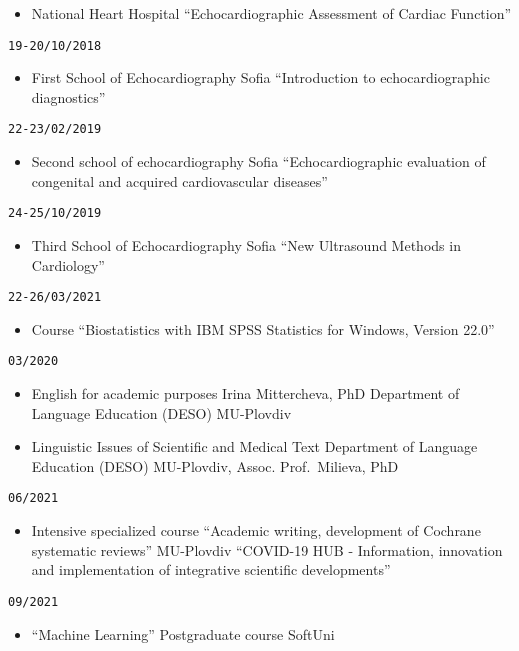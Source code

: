 \documentclass[
  12pt,
  letterpaper,
  DIV=11,
  numbers=noendperiod]{scrartcl}
\providecommand{\tightlist}{%
  \setlength{\itemsep}{0pt}\setlength{\parskip}{0pt}}\usepackage{longtable,booktabs,array}
\begin{document}
\begin{itemize}
\tightlist
\item
  National Heart Hospital \textbar{} ``Echocardiographic Assessment of
  Cardiac Function''
\end{itemize}

\texttt{19-20/10/2018}

\begin{itemize}
\tightlist
\item
  First School of Echocardiography \textbar{} Sofia \textbar{}
  ``Introduction to echocardiographic diagnostics''
\end{itemize}

\texttt{22-23/02/2019}

\begin{itemize}
\tightlist
\item
  Second school of echocardiography \textbar{} Sofia \textbar{}
  ``Echocardiographic evaluation of congenital and acquired
  cardiovascular diseases''
\end{itemize}

\texttt{24-25/10/2019}

\begin{itemize}
\tightlist
\item
  Third School of Echocardiography \textbar{} Sofia \textbar{} ``New
  Ultrasound Methods in Cardiology''
\end{itemize}

\texttt{22-26/03/2021}

\begin{itemize}
\tightlist
\item
  Course ``Biostatistics with IBM SPSS Statistics for Windows, Version
  22.0''
\end{itemize}

\texttt{03/2020}

\begin{itemize}
\item
  English for academic purposes \textbar{} Irina Mittercheva, PhD
  \textbar{} Department of Language Education (DESO) \textbar{}
  MU-Plovdiv
\item
  Linguistic Issues of Scientific and Medical Text \textbar{} Department
  of Language Education (DESO) \textbar{} MU-Plovdiv, Assoc.
  Prof.~Milieva, PhD
\end{itemize}

\texttt{06/2021}

\begin{itemize}
\tightlist
\item
  Intensive specialized course \textbar{} ``Academic writing,
  development of Cochrane systematic reviews'' \textbar{} MU-Plovdiv
  \textbar{} ``COVID-19 HUB - Information, innovation and implementation
  of integrative scientific developments''
\end{itemize}

\texttt{09/2021}

\begin{itemize}
\tightlist
\item
  ``Machine Learning'' Postgraduate course \textbar{} SoftUni
\end{itemize}
\end{document}
